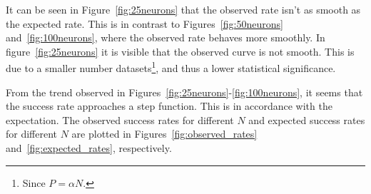 It can be seen in Figure~\ref{fig:25neurons} that the observed rate isn't as smooth as the expected rate.
This is in contrast to Figures~\ref{fig:50neurons} and~\ref{fig:100neurons}, where the observed rate behaves more smoothly.
In figure~\ref{fig:25neurons} it is visible that the observed curve is not smooth. This is due to a smaller number datasets\footnote{Since \(P = \alpha N\).}, and thus a lower statistical significance.

From the trend observed in Figures~\ref{fig:25neurons}-\ref{fig:100neurons}, it seems that the success rate approaches a step function.
This is in accordance with the expectation.
The observed success rates for different \(N\) and expected success rates for different \(N\) are plotted in Figures~\ref{fig:observed_rates} and~\ref{fig:expected_rates}, respectively.


